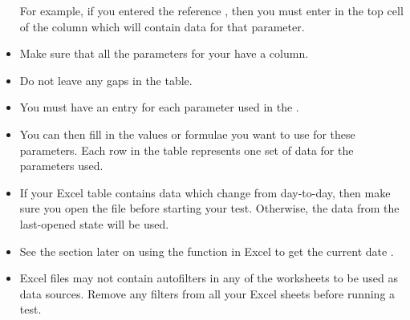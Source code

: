 \begin{itemize}
For example, if you entered the reference , then you must enter  in the top cell of the column which will contain data for that parameter. 
\item Make sure that all the parameters for your \gdcase{} have a column.
\item Do not leave any gaps in the table.
\item You must have an entry for each parameter used in the \gdcase{}. 
\item You can then fill in the values or formulae you want to use for these parameters. Each row in the table represents one set of data for the parameters used. 
\item If your Excel table contains data which change from day-to-day, then make sure you open the file before starting your test. Otherwise, the data from the last-opened state will be used.
\item See the section later on using the  function in Excel to get the current date . 
\item Excel files may not contain autofilters in any of the worksheets to be used as data sources. Remove any filters from all your Excel sheets before running a test. 
\end{itemize}

